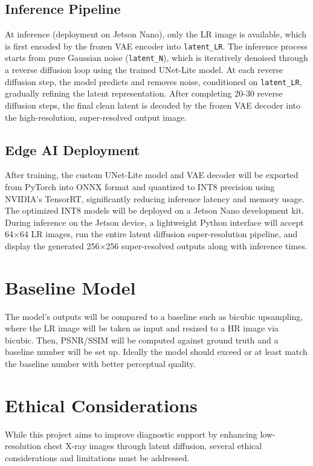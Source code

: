 \documentclass{article} %
\begin{document}
\subsection{Inference Pipeline}

At inference (deployment on Jetson Nano), only the LR image is available, which is first encoded by the frozen VAE encoder into \texttt{latent\_LR}. The inference process starts from pure Gaussian noise (\texttt{latent\_N}), which is iteratively denoised through a reverse diffusion loop using the trained UNet-Lite model. At each reverse diffusion step, the model predicts and removes noise, conditioned on \texttt{latent\_LR}, gradually refining the latent representation. After completing 20-30 reverse diffusion steps, the final clean latent is decoded by the frozen VAE decoder into the high-resolution, super-resolved output image.

\subsection{Edge AI Deployment}

After training, the custom UNet-Lite model and VAE decoder will be exported from PyTorch into ONNX format and quantized to INT8 precision using NVIDIA’s TensorRT, significantly reducing inference latency and memory usage. The optimized INT8 models will be deployed on a Jetson Nano development kit. During inference on the Jetson device, a lightweight Python interface will accept 64×64 LR images, run the entire latent diffusion super-resolution pipeline, and display the generated 256×256 super-resolved outputs along with inference times.

\section{Baseline Model}

The model’s outputs will be compared to a baseline such as bicubic upsampling, where the LR image will be taken as input and resized to a HR image via bicubic. Then, PSNR/SSIM will be computed against ground truth and a baseline number will be set up. Ideally the model should exceed or at least match  the baseline number with better perceptual quality.

\section{Ethical Considerations}

While this project aims to improve diagnostic support by enhancing low-resolution chest X-ray images through latent diffusion, several ethical considerations and limitations must be addressed.
\end{document}
